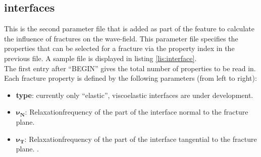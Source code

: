     \subsection{interfaces}
    \label{subsec:interfaces}
    	This is the second parameter file that is added as part of the feature to calculate the influence of fractures on the wave-field. This parameter file specifies the properties that can be selected for a fracture via the property index in the previous file. A sample file is displayed in listing \ref{lis:interface}.
    	 \\
    	The first entry after ``BEGIN'' gives the total number of properties to be read in. \\
    	Each fracture property is defined by the following parameters (from left to right):
    	\begin{itemize}
    		\item \textbf{type}: currently only ``elastic'', viscoelastic interfaces are under development.
    		\item $\mathbf{\nu_N}$: Relaxationfrequency of the part of the interface normal to the fracture plane.
    		\item $\mathbf{\nu_T}$: Relaxationfrequency of the part of the interface tangential to the fracture plane. \citep[see][for details]{Moeller.2018}.

    	\end{itemize}
